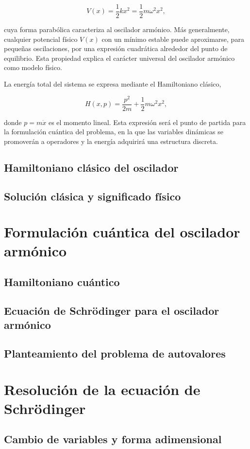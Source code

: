 \documentclass[11pt,a4paper,spanish]{book}
\begin{document}
\[
V(x) = \frac{1}{2} k x^2 = \frac{1}{2} m\omega^2 x^2,
\]

cuya forma parabólica caracteriza al oscilador armónico. Más generalmente, cualquier potencial físico $V(x)$ con un mínimo estable puede aproximarse, para pequeñas oscilaciones, por una expresión cuadrática alrededor del punto de equilibrio. Esta propiedad explica el carácter universal del oscilador armónico como modelo físico.

La energía total del sistema se expresa mediante el Hamiltoniano clásico,

\[
H(x,p) = \frac{p^2}{2m} + \frac{1}{2} m\omega^2 x^2,
\]

donde $p = m\dot{x}$ es el momento lineal. Esta expresión será el punto de partida para la formulación cuántica del problema, en la que las variables dinámicas se promoverán a operadores y la energía adquirirá una estructura discreta.
\subsection{Hamiltoniano clásico del oscilador}
\subsection{Solución clásica y significado físico}

\section{Formulación cuántica del oscilador armónico}
\subsection{Hamiltoniano cuántico}
\subsection{Ecuación de Schrödinger para el oscilador armónico}
\subsection{Planteamiento del problema de autovalores}

\section{Resolución de la ecuación de Schrödinger}
\subsection{Cambio de variables y forma adimensional}
\end{document}
